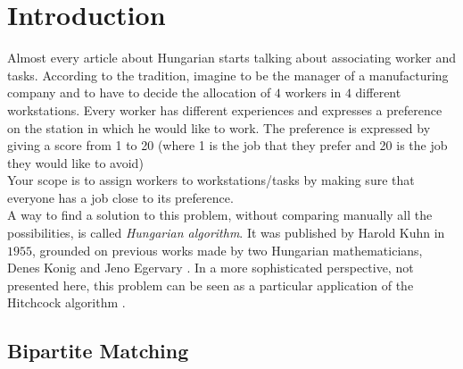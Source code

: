 \documentclass[12pt]{ClasseMatematicamente}
\begin{document}
\section*{Introduction}\label{se:introduction}

Almost every article about Hungarian starts talking about associating worker and tasks. According to the tradition, imagine to be the manager of a manufacturing company and to have to decide the allocation of $4$ workers in $4$ different workstations. 
Every worker has different experiences and expresses a preference on the station in which he would like to work. The preference is expressed by giving a score from 1 to 20 (where 1 is the job that they prefer and 20 is the job they would like to avoid) \\
Your scope is to assign workers to workstations/tasks by making sure that everyone has a job close to its preference.\\
A way to find a solution to this problem, without comparing manually all the possibilities, is called \emph{Hungarian algorithm}. It was published by Harold Kuhn in $1955$, grounded on previous works made by two Hungarian mathematicians, Denes Konig and Jeno Egervary \cite{wiki}. In a more sophisticated perspective, not presented here, this problem can be seen as a particular application of the Hitchcock algorithm \cite{papadmitriou}.   

\subsection*{Bipartite Matching}
\end{document}
